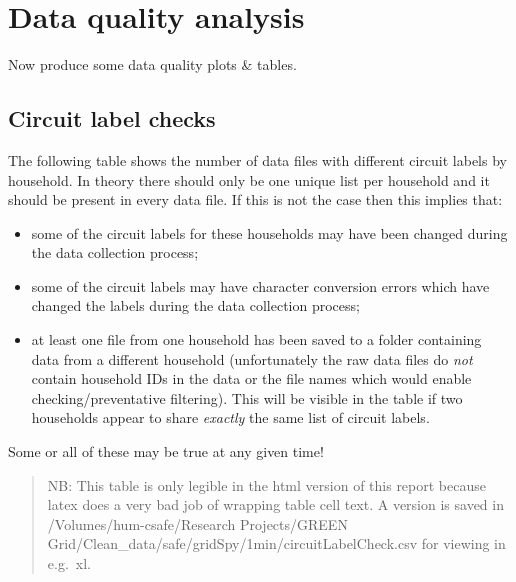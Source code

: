 \documentclass[]{article}
\providecommand{\tightlist}{%
  \setlength{\itemsep}{0pt}\setlength{\parskip}{0pt}}
\begin{document}
\section{Data quality analysis}\label{data-quality-analysis}

Now produce some data quality plots \& tables.

\subsection{Circuit label checks}\label{circuit-label-checks}

The following table shows the number of data files with different
circuit labels by household. In theory there should only be one unique
list per household and it should be present in every data file. If this
is not the case then this implies that:

\begin{itemize}
\tightlist
\item
  some of the circuit labels for these households may have been changed
  during the data collection process;
\item
  some of the circuit labels may have character conversion errors which
  have changed the labels during the data collection process;
\item
  at least one file from one household has been saved to a folder
  containing data from a different household (unfortunately the raw data
  files do \emph{not} contain household IDs in the data or the file
  names which would enable checking/preventative filtering). This will
  be visible in the table if two households appear to share
  \emph{exactly} the same list of circuit labels.
\end{itemize}

Some or all of these may be true at any given time!

\begin{quote}
NB: This table is only legible in the html version of this report
because latex does a very bad job of wrapping table cell text. A version
is saved in /Volumes/hum-csafe/Research Projects/GREEN
Grid/Clean\_data/safe/gridSpy/1min/circuitLabelCheck.csv for viewing in
e.g.~xl.
\end{quote}
\end{document}
